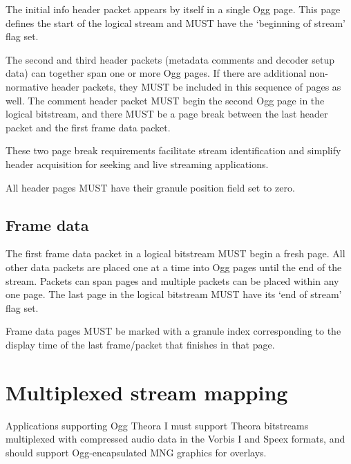 \documentclass[9pt,letterpaper]{book}
\numberwithin{equation}{chapter}
\numberwithin{figure}{chapter}
\numberwithin{table}{chapter}
\begin{document}
The initial info header packet appears by itself in a single Ogg page.
This page defines the start of the logical stream and MUST have
 the `beginning of stream' flag set.

The second and third header packets (metadata comments and decoder
 setup data) can together span one or more Ogg pages.
If there are additional non-normative header packets, they MUST be
 included in this sequence of pages as well.
The comment header packet MUST begin the second Ogg page in the logical
 bitstream, and there MUST be a page break between the last header
 packet and the first frame data packet.

These two page break requirements facilitate stream identification and
 simplify header acquisition for seeking and live streaming applications.

All header pages MUST have their granule position field set to zero.

\subsection{Frame data}

The first frame data packet in a logical bitstream MUST begin a fresh page.
All other data packets are placed one at a time into Ogg pages
 until the end of the stream.
Packets can span pages and multiple packets can be placed within any
 one page.
The last page in the logical bitstream MUST have its `end of stream'
 flag set.

Frame data pages MUST be marked with a granule index corresponding to
 the display time of the last frame/packet that finishes in that page.


\section{Multiplexed stream mapping}

Applications supporting Ogg Theora I must support Theora bitstreams
 multiplexed with compressed audio data in the Vorbis I and Speex
 formats, and should support Ogg-encapsulated MNG graphics for overlays.
\end{document}
